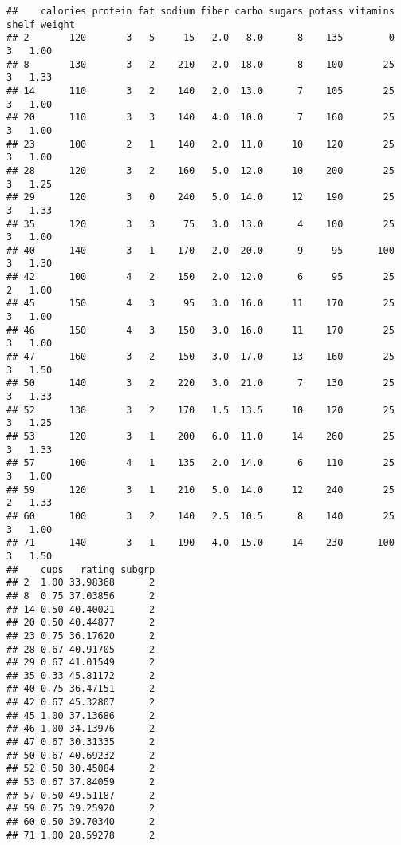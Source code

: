 \documentclass[
]{article}
\newenvironment{Shaded}{\begin{snugshade}}{\end{snugshade}}
\newcommand{\DecValTok}[1]{\textcolor[rgb]{0.00,0.00,0.81}{#1}}
\newcommand{\NormalTok}[1]{#1}
\newcommand{\SpecialCharTok}[1]{\textcolor[rgb]{0.00,0.00,0.00}{#1}}
\begin{document}
\begin{Shaded}
\end{Shaded}

\begin{verbatim}
##    calories protein fat sodium fiber carbo sugars potass vitamins shelf weight
## 2       120       3   5     15   2.0   8.0      8    135        0     3   1.00
## 8       130       3   2    210   2.0  18.0      8    100       25     3   1.33
## 14      110       3   2    140   2.0  13.0      7    105       25     3   1.00
## 20      110       3   3    140   4.0  10.0      7    160       25     3   1.00
## 23      100       2   1    140   2.0  11.0     10    120       25     3   1.00
## 28      120       3   2    160   5.0  12.0     10    200       25     3   1.25
## 29      120       3   0    240   5.0  14.0     12    190       25     3   1.33
## 35      120       3   3     75   3.0  13.0      4    100       25     3   1.00
## 40      140       3   1    170   2.0  20.0      9     95      100     3   1.30
## 42      100       4   2    150   2.0  12.0      6     95       25     2   1.00
## 45      150       4   3     95   3.0  16.0     11    170       25     3   1.00
## 46      150       4   3    150   3.0  16.0     11    170       25     3   1.00
## 47      160       3   2    150   3.0  17.0     13    160       25     3   1.50
## 50      140       3   2    220   3.0  21.0      7    130       25     3   1.33
## 52      130       3   2    170   1.5  13.5     10    120       25     3   1.25
## 53      120       3   1    200   6.0  11.0     14    260       25     3   1.33
## 57      100       4   1    135   2.0  14.0      6    110       25     3   1.00
## 59      120       3   1    210   5.0  14.0     12    240       25     2   1.33
## 60      100       3   2    140   2.5  10.5      8    140       25     3   1.00
## 71      140       3   1    190   4.0  15.0     14    230      100     3   1.50
##    cups   rating subgrp
## 2  1.00 33.98368      2
## 8  0.75 37.03856      2
## 14 0.50 40.40021      2
## 20 0.50 40.44877      2
## 23 0.75 36.17620      2
## 28 0.67 40.91705      2
## 29 0.67 41.01549      2
## 35 0.33 45.81172      2
## 40 0.75 36.47151      2
## 42 0.67 45.32807      2
## 45 1.00 37.13686      2
## 46 1.00 34.13976      2
## 47 0.67 30.31335      2
## 50 0.67 40.69232      2
## 52 0.50 30.45084      2
## 53 0.67 37.84059      2
## 57 0.50 49.51187      2
## 59 0.75 39.25920      2
## 60 0.50 39.70340      2
## 71 1.00 28.59278      2
\end{verbatim}
\end{document}
